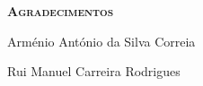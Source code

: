 
\vspace*{45pt}
\begin{flushleft}
	{\Large \textbf{\scshape{Agradecimentos}}}
\end{flushleft}
\vspace*{10pt}


Arménio António da Silva Correia

Rui Manuel Carreira Rodrigues